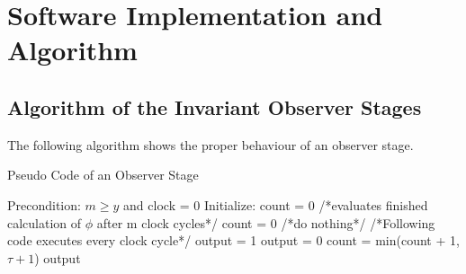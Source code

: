 
\chapter{Software Implementation and Algorithm}



\section{Algorithm of the Invariant Observer Stages}

The following algorithm shows the proper behaviour of an observer stage.\newline

\begin{algorithm}
\caption{Pseudo Code of an Observer Stage}
\label{alg:observerstage}
\begin{algorithmic}[1]
\REQUIRE Precondition: $m \ge y$ and clock = 0
\STATE Initialize: count = 0
 \STATE  /*evaluates finished calculation of $\phi$ after m clock cycles*/
 \STATE  count = 0 
 \ELSE
  \STATE /*do nothing*/ 
 \ENDIF
\ENDIF 
\STATE /*Following code executes every clock cycle*/
 \STATE output = 1
\ELSE
 \STATE output = 0
\ENDIF
\STATE count = min(count + 1,$\tau + 1$)
\RETURN output
\end{algorithmic}
\end{algorithm}

